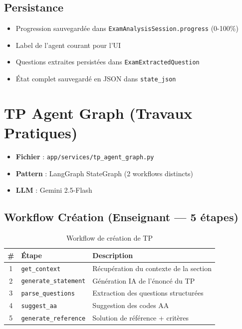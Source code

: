 \documentclass[12pt,a4paper]{article}
\begin{document}
\subsection{Persistance}
\begin{itemize}
    \item Progression sauvegardée dans \texttt{ExamAnalysisSession.progress} (0-100\%)
    \item Label de l'agent courant pour l'UI
    \item Questions extraites persistées dans \texttt{ExamExtractedQuestion}
    \item État complet sauvegardé en JSON dans \texttt{state\_json}
\end{itemize}

\section{TP Agent Graph (Travaux Pratiques)}

\begin{itemize}[leftmargin=*]
    \item \textbf{Fichier} : \texttt{app/services/tp\_agent\_graph.py}
    \item \textbf{Pattern} : LangGraph StateGraph (2 workflows distincts)
    \item \textbf{LLM} : Gemini 2.5-Flash
\end{itemize}

\subsection{Workflow Création (Enseignant --- 5 étapes)}

\begin{table}[h!]
\centering
\begin{tabular}{@{}clp{8cm}@{}}
\toprule
\textbf{\#} & \textbf{Étape} & \textbf{Description} \\
\midrule
1 & \texttt{get\_context} & Récupération du contexte de la section \\
2 & \texttt{generate\_statement} & Génération IA de l'énoncé du TP \\
3 & \texttt{parse\_questions} & Extraction des questions structurées \\
4 & \texttt{suggest\_aa} & Suggestion des codes AA \\
5 & \texttt{generate\_reference} & Solution de référence + critères \\
\bottomrule
\end{tabular}
\caption{Workflow de création de TP}
\end{table}
\end{document}
